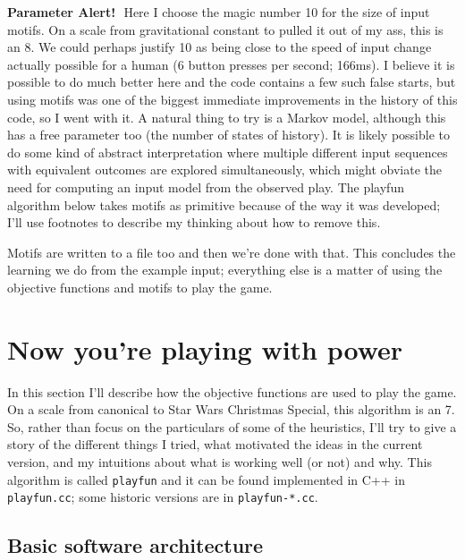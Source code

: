 \documentclass[twocolumn]{article}
\newcommand\parameteralert[1]{
  {\bf Parameter Alert!}\,\, #1
}
\begin{document}
\parameteralert{Here I choose the magic number 10 for the size of input
  motifs. On a scale from gravitational constant to pulled it out of
  my ass, this is an 8. We could perhaps justify 10 as being close to
  the speed of input change actually possible for a human (6 button
  presses per second; 166ms). I believe it is possible to do much
  better here and the code contains a few such false starts, but using
  motifs was one of the biggest immediate improvements in the history
  of this code, so I went with it. A natural thing to try is a Markov
  model, although this has a free parameter too (the number of states
  of history). It is likely possible to do some kind of abstract
  interpretation where multiple different input sequences with
  equivalent outcomes are explored simultaneously, which might obviate
  the need for computing an input model from the observed play. The
  playfun algorithm below takes motifs as primitive because of the way
  it was developed; I'll use footnotes to describe my thinking about
  how to remove this.}

Motifs are written to a file too and then we're done with that. This
concludes the learning we do from the example input; everything else
is a matter of using the objective functions and motifs to play the
game.

\section{Now you're playing with power} \label{sec:playfun}

In this section I'll describe how the objective functions are used to
play the game. On a scale from canonical to Star Wars Christmas
Special, this algorithm is an 7. So, rather than focus on the
particulars of some of the heuristics, I'll try to give a story of the
different things I tried, what motivated the ideas in the current
version, and my intuitions about what is working well (or not) and
why. This algorithm is called {\tt playfun} and it can be found
implemented in C++ in {\tt playfun.cc}; some historic versions are
in {\tt playfun-*.cc}.

\subsection{Basic software architecture}
\end{document}
